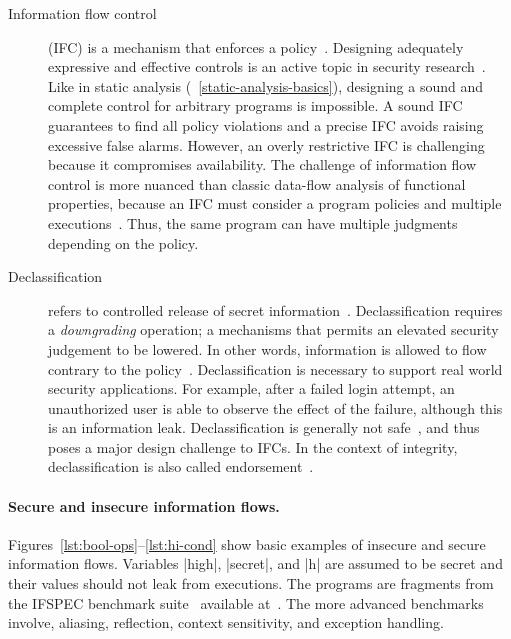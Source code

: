\begin{description}
\item[Information flow control] (IFC)
is a mechanism that enforces a {policy}~\cite{bishop2003}.
Designing adequately expressive and effective controls is an active topic in security research~\cite{vandermeyden2007,bossi2005,sabelfeld2003}.
Like in static analysis (\cf~\autoref{static-analysis-basics}), designing a sound and complete control for arbitrary programs is impossible.
A sound IFC guarantees to find all policy violations and a precise IFC avoids raising excessive false alarms.
However, an overly restrictive IFC is challenging because it compromises availability.
The challenge of information flow control is more nuanced than classic data-flow analysis of functional properties,
because an IFC must consider a program \wrt policies and multiple executions~\cite{frumin2021}.
Thus, the same program can have multiple judgments depending on the policy.

\item[Declassification]
refers to controlled release of secret information~\cite{sabelfeld2009}.
Declassification requires a \emph{downgrading} operation;
a mechanisms that permits an elevated security judgement to be lowered.
In other words, information is allowed to flow contrary to the {policy}~\cite{cecchetti2017}.
Declassification is necessary to support real world security applications.
For example, after a failed login attempt, an unauthorized user is able to observe the effect of the failure, 
although this is an information leak.
Declassification is generally not safe~\cite{derakhshan2024}, 
and thus poses a major design challenge to IFCs.
In the context of integrity, declassification is also called {endorsement}~\cite{marion2011}.

\end{description}

\paragraph*{Secure and insecure information flows.}
Figures~\ref{lst:bool-ops}--\ref{lst:hi-cond} show basic examples of insecure and secure information flows.
Variables \pr|high|, \pr|secret|, and \pr|h| are assumed to be secret and their values should not leak from executions.
The programs are fragments from the {IFSPEC benchmark suite}~\cite{hamann2018} available at~\cite{ifspec}.
The more advanced benchmarks involve, \eg aliasing, reflection, context sensitivity, and exception handling.

